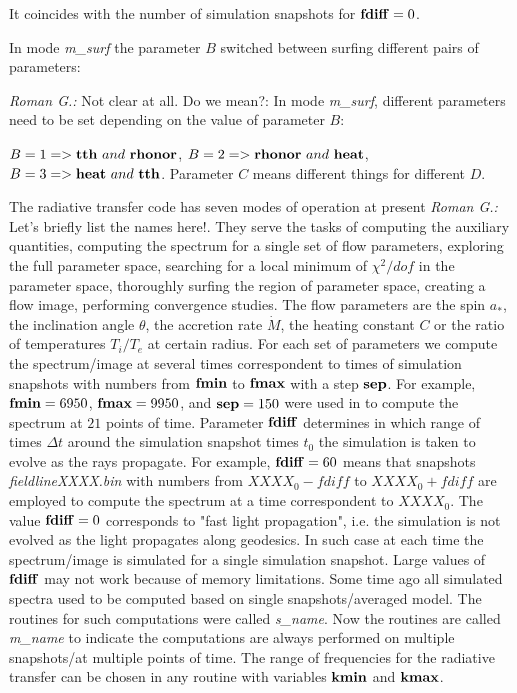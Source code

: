 \documentclass{emulateapj}
\newcommand{\rg}[1]{\color{blue}\textit{Roman G.:} #1\color{black}}
\begin{document}
It coincides with the number of simulation snapshots for ${\bf
  fdiff}=0$. 

In mode \textit{m\_surf} the parameter $B$ switched between surfing
different pairs of parameters: 

\rg{Not clear at all. Do we mean?: In mode \textit{m\_surf}, different
  parameters need to be set depending on the value of parameter $B$: }

$B=1 => {\bf tth}~and~{\bf rhonor}$, $B=2 => {\bf rhonor}~and~{\bf
  heat}$, $B=3 => {\bf heat}~and~{\bf tth}$.  Parameter $C$ means
different things for different $D$.

The radiative transfer code has seven modes of operation at present
\rg{Let's briefly list the names here!}. They serve the tasks of
computing the auxiliary quantities, computing the spectrum for a
single set of flow parameters, exploring the full parameter space,
searching for a local minimum of $\chi^2/dof$ in the parameter space,
thoroughly surfing the region of parameter space, creating a flow
image, performing convergence studies.  The flow parameters are the
spin $a_*$, the inclination angle $\theta$, the accretion rate
$\dot{M}$, the heating constant $C$ or the ratio of temperatures
$T_i/T_e$ at certain radius.  For each set of parameters we compute
the spectrum/image at several times correspondent to times of
simulation snapshots with numbers from ${\bf fmin}$ to ${\bf fmax}$
with a step ${\bf sep}$. For example, ${\bf fmin}=6950$, ${\bf
  fmax}=9950$, and ${\bf sep}=150$ were used in
\citet{Shcherbakov:2012appl} to compute the spectrum at $21$ points of
time. Parameter ${\bf fdiff}$ determines in which range of times
$\Delta t$ around the simulation snapshot times $t_0$ the simulation
is taken to evolve as the rays propagate. For example, ${\bf
  fdiff}=60$ means that snapshots \textit{fieldlineXXXX.bin} with
numbers from $XXXX_0-fdiff$ to $XXXX_0+fdiff$ are employed to compute
the spectrum at a time correspondent to $XXXX_0$. The value ${\bf
  fdiff}=0$ corresponds to "fast light propagation", i.e. the
simulation is not evolved as the light propagates along geodesics. In
such case at each time the spectrum/image is simulated for a single
simulation snapshot. Large values of ${\bf fdiff}$ may not work
because of memory limitations. Some time ago all simulated spectra
used to be computed based on single snapshots/averaged model.  The
routines for such computations were called \textit{s\_name}. Now the
routines are called \textit{m\_name} to indicate the computations are
always performed on multiple snapshots/at multiple points of time.
The range of frequencies for the radiative transfer can be chosen in
any routine with variables ${\bf kmin}$ and ${\bf kmax}$.
\end{document}
